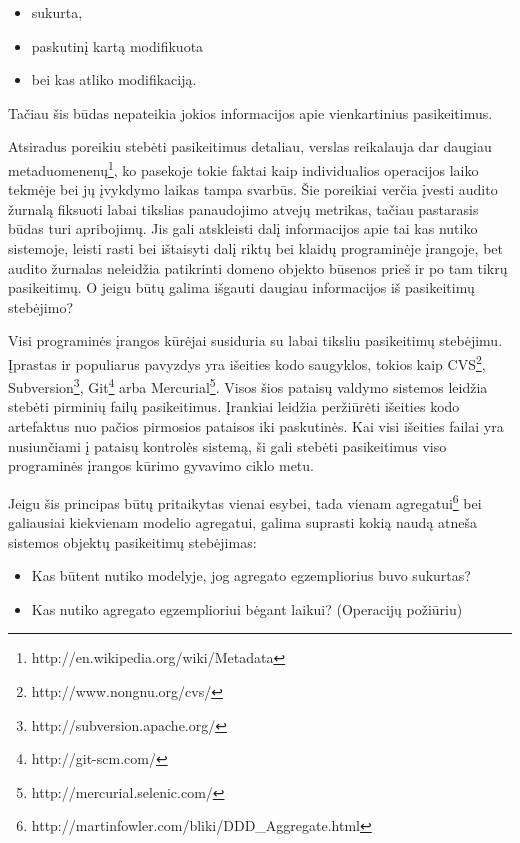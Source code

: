 \begin{itemize}

	\item sukurta,

	\item paskutinį kartą modifikuota

	\item bei kas atliko modifikaciją.

\end{itemize}

Tačiau šis būdas nepateikia jokios informacijos apie vienkartinius pasikeitimus.

Atsiradus poreikiu stebėti pasikeitimus detaliau, verslas reikalauja dar daugiau metaduomenenų\footnote{http://en.wikipedia.org/wiki/Metadata}, ko pasekoje tokie faktai kaip individualios operacijos laiko tekmėje bei jų įvykdymo laikas tampa svarbūs. Šie poreikiai verčia įvesti audito žurnalą fiksuoti labai tikslias panaudojimo atvejų metrikas, tačiau pastarasis būdas turi apribojimų. Jis gali atskleisti dalį informacijos apie tai kas nutiko sistemoje, leisti rasti bei ištaisyti dalį riktų bei klaidų programinėje įrangoje, bet audito žurnalas neleidžia patikrinti domeno objekto būsenos prieš ir po tam tikrų pasikeitimų. O jeigu būtų galima išgauti daugiau informacijos iš pasikeitimų stebėjimo?

Visi programinės įrangos kūrėjai susiduria su labai tiksliu pasikeitimų stebėjimu. Įprastas ir populiarus pavyzdys yra išeities kodo saugyklos, tokios kaip CVS\footnote{http://www.nongnu.org/cvs/}, Subversion\footnote{http://subversion.apache.org/}, Git\footnote{http://git-scm.com/} arba Mercurial\footnote{http://mercurial.selenic.com/}. Visos šios pataisų valdymo sistemos leidžia stebėti pirminių failų pasikeitimus. Įrankiai leidžia peržiūrėti išeities kodo artefaktus nuo pačios pirmosios pataisos iki paskutinės. Kai visi išeities failai yra nusiunčiami į pataisų kontrolės sistemą, ši gali stebėti pasikeitimus viso programinės įrangos kūrimo gyvavimo ciklo metu.

Jeigu šis principas būtų pritaikytas vienai esybei, tada vienam agregatui\footnote{http://martinfowler.com/bliki/DDD\_Aggregate.html} bei galiausiai kiekvienam modelio agregatui, galima suprasti kokią naudą atneša sistemos objektų pasikeitimų stebėjimas:

\begin{itemize}

	\item Kas būtent nutiko modelyje, jog agregato egzempliorius buvo sukurtas?

	\item Kas nutiko agregato egzemplioriui bėgant laikui? (Operacijų požiūriu)

\end{itemize}

